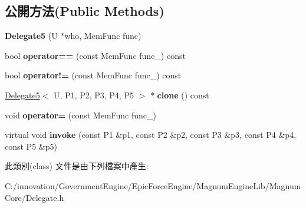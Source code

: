 \subsection*{公開方法(Public Methods)}
\begin{DoxyCompactItemize}
\item 
{\bfseries Delegate5} (U $\ast$who, Mem\+Func func)\hypertarget{class_i_dream_sky_1_1_delegate5_aaebe1088d4925195d160ad0e8dbd3fbd}{}\label{class_i_dream_sky_1_1_delegate5_aaebe1088d4925195d160ad0e8dbd3fbd}

\item 
bool {\bfseries operator==} (const Mem\+Func func\+\_\+) const \hypertarget{class_i_dream_sky_1_1_delegate5_ab125438fa406b7c59b479d24ea517d6d}{}\label{class_i_dream_sky_1_1_delegate5_ab125438fa406b7c59b479d24ea517d6d}

\item 
bool {\bfseries operator!=} (const Mem\+Func func\+\_\+) const \hypertarget{class_i_dream_sky_1_1_delegate5_a4dece461f3a7b72e911841755404b97e}{}\label{class_i_dream_sky_1_1_delegate5_a4dece461f3a7b72e911841755404b97e}

\item 
\hyperlink{class_i_dream_sky_1_1_delegate5}{Delegate5}$<$ U, P1, P2, P3, P4, P5 $>$ $\ast$ {\bfseries clone} () const \hypertarget{class_i_dream_sky_1_1_delegate5_a856e0ad502ac857779542025d03bc0a5}{}\label{class_i_dream_sky_1_1_delegate5_a856e0ad502ac857779542025d03bc0a5}

\item 
void {\bfseries operator=} (const Mem\+Func func\+\_\+)\hypertarget{class_i_dream_sky_1_1_delegate5_a7ab96070a817014fdee55ca8dcce50c6}{}\label{class_i_dream_sky_1_1_delegate5_a7ab96070a817014fdee55ca8dcce50c6}

\item 
virtual void {\bfseries invoke} (const P1 \&p1, const P2 \&p2, const P3 \&p3, const P4 \&p4, const P5 \&p5)\hypertarget{class_i_dream_sky_1_1_delegate5_a4567f5fdadad9188e4b16998f600c741}{}\label{class_i_dream_sky_1_1_delegate5_a4567f5fdadad9188e4b16998f600c741}

\end{DoxyCompactItemize}


此類別(class) 文件是由下列檔案中產生\+:\begin{DoxyCompactItemize}
\item 
C\+:/innovation/\+Government\+Engine/\+Epic\+Force\+Engine/\+Magnum\+Engine\+Lib/\+Magnum\+Core/Delegate.\+h\end{DoxyCompactItemize}
